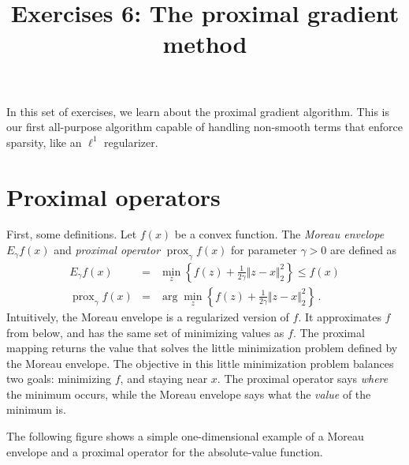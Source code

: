 \documentclass{mynotes}
\title[Exercises 6 $\cdot$ SDS 385]{Exercises 6: The proximal gradient method}
\date{}  %
\newcommand{\prox}{ \mathop{\mathrm{prox}} }
\newcommand{\enorm}[1]{\Vert #1 \Vert_2}
\begin{document}
\maketitle%

\bigskip

In this set of exercises, we learn about the proximal gradient algorithm.  This is our first all-purpose algorithm capable of handling non-smooth terms that enforce sparsity, like an $\ell^1$ regularizer.

\section{Proximal operators}

First, some definitions.  Let $f(x)$ be a convex function.  The \textit{Moreau envelope} $E_{\gamma} f(x)$ and \textit{proximal operator} $\prox_{\gamma} f(x)$ for parameter $\gamma > 0$ are defined as
\begin{eqnarray}
E_{\gamma} f(x) &=& \min_{z } \left\{f(z) + \frac{1}{2\gamma} \enorm{z - x}^2  \right\}  \leq f(x) \\
\prox_{\gamma} f(x) &=& \arg \min_{z } \left\{  f(z)+ \frac{1}{2\gamma} \enorm{z - x}^2  \right\} \, .
\end{eqnarray}
Intuitively, the Moreau envelope is a regularized version of $f$.  It approximates $f$ from below, and has the same set of minimizing values as $f$.  The proximal mapping returns the value that solves the little minimization problem defined by the Moreau envelope.  The objective in this little minimization problem balances two goals: minimizing $f$, and staying near $x$.  The proximal operator says \textit{where} the minimum occurs, while the Moreau envelope says what the \textit{value} of the minimum is.

The following figure shows a simple one-dimensional example of a Moreau envelope and a proximal operator for the absolute-value function.
\end{document}
